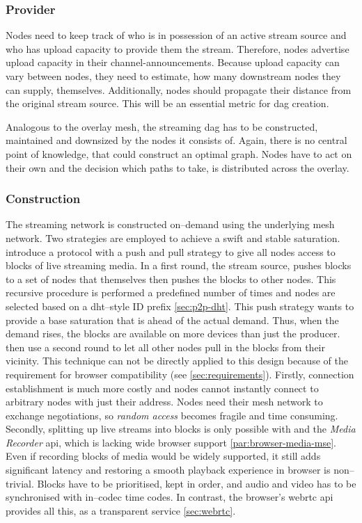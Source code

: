 \subsubsection{Provider}\label{sec:design-stream-provider}
Nodes need to keep track of who is in possession of an active stream source and who has upload capacity to provide them the stream. Therefore, nodes advertise upload capacity in their \glspl{channel-announcement}. Because upload capacity can vary between nodes, they need to estimate, how many downstream nodes they can supply, themselves. Additionally, nodes should propagate their distance from the original stream source. This will be an essential metric for \gls{dag} creation.

Analogous to the overlay mesh, the streaming \gls{dag} has to be constructed, maintained and downsized by the nodes it consists of. Again, there is no central point of knowledge, that could construct an optimal graph. Nodes have to act on their own and the decision which paths to take, is distributed across the overlay.

\subsubsection{Construction}\label{sec:design-stream-construction}
The streaming network is constructed on–demand using the underlying mesh network. Two strategies are employed to achieve a swift and stable saturation.
\citet*[\S3]{push-to-pull} introduce a protocol with a push and pull strategy to give all nodes access to blocks of live streaming media. In a first round, the stream source, pushes blocks to a set of nodes that themselves then pushes the blocks to other nodes. This recursive procedure is performed a predefined number of times and nodes are selected based on a \gls{dht}–style ID prefix \cref{sec:p2p-dht}. This push strategy wants to provide a base saturation that is ahead of the actual demand. Thus, when the demand rises, the blocks are available on more devices than just the producer. \citet{push-to-pull} then use a second round to let all other nodes pull in the blocks from their vicinity. This technique can not be directly applied to this design because of the requirement for browser compatibility (see \vref{sec:requirements}). Firstly, connection establishment is much more costly and nodes cannot instantly connect to arbitrary nodes with just their address. Nodes need their mesh network to exchange negotiations, so \textit{random access} becomes fragile and time consuming.
Secondly, splitting up live streams into blocks is only possible with  and the \textit{Media Recorder} \gls{api}, which is lacking wide browser support \cref{par:browser-media-mse}. Even if recording blocks of media would be widely supported, it still adds significant latency and restoring a smooth playback experience in browser is non–trivial. Blocks have to be prioritised, kept in order, and audio and video has to be synchronised with in–codec time codes.
In contrast, the browser's \gls{webrtc} \gls{api} provides all this, as a transparent service \ref{sec:webrtc}.

